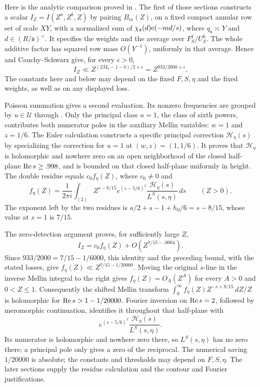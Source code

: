 Here is the analytic comparison proved in .
The first of those sections constructs a scalar
\(I_Z=I(Z^a,Z^b,Z)\) by pairing \(B_m(Z)\), on a fixed compact annular
row set of scale \(XY\), with a normalized sum of
\(\chi_{\mathfrak s}(d)\mathrm{e}(-md/s)\), where
\(q_{\mathfrak s}\asymp Y\) and \(d\in(R/\mathfrak s)^\times\).
It specifies the weights and the average over \(F_S^1/U_S^6\).
The whole additive factor has squared row mass \(O(Y^{-1})\), uniformly in
that average.  Hence  and Cauchy--Schwarz give,
for every \(\epsilon>0\),
\[
 I_Z\ll Z^{(2M_0-1-b)/2+\epsilon}
       =Z^{933/2000+\epsilon}.
\]
The constants here and below may depend on the fixed \(F,S,\eta\) and the
fixed weights, as well as on any displayed loss.

Poisson summation gives a second evaluation.  Its nonzero frequencies are
grouped by \(u\in\mathcal U\) through .
Only the principal class \(u=1\), the class of sixth powers, contributes
both numerator poles in the auxiliary Mellin variables: \(w=1\) and
\(z=1/6\).  The Euler calculation constructs a specific principal correction
\(\mathcal H_\eta(s)\) by specializing the correction for \(u=1\) at
\((w,z)=(1,1/6)\).  It proves that \(\mathcal H_\eta\) is holomorphic and
nowhere zero on an open neighborhood of the closed half-plane
\(\operatorname{Re} s\ge .998\), and is bounded on that closed half-plane uniformly in
height.  The double residue equals \(c_0f_\eta(Z)\), where \(c_0\ne0\) and
\[
 f_\eta(Z)=\frac1{2\pi i}\int_{(2)}
       Z^{s-8/15}e^{(s-5/6)^2}
       \frac{\mathcal H_\eta(s)}{L^S(s,\eta)}\,ds
       \qquad(Z>0).
\]
The exponent left by the two residues is
\(a/2+s-1+h_0/6=s-8/15\), whose value at \(s=1\) is \(7/15\).

The zero-detection argument proves, for sufficiently large \(Z\),
\[
 I_Z=c_0f_\eta(Z)+O(Z^{7/15-.0004}).
\]
Since \(933/2000=7/15-1/6000\), this identity and the preceding bound,
with the stated losses, give \(f_\eta(Z)\ll Z^{7/15-1/20000}\).
Moving the original \(s\)-line in the inverse Mellin integral to the right
gives \(f_\eta(Z)=O_A(Z^A)\) for every \(A>0\) and \(0<Z\le1\).
Consequently the shifted Mellin transform
\(\int_0^\infty f_\eta(Z)Z^{-s+8/15}\,dZ/Z\) is holomorphic for
\(\operatorname{Re} s>1-1/20000\).  Fourier inversion on \(\operatorname{Re} s=2\), followed by
meromorphic continuation, identifies it throughout that half-plane with
\[
 e^{(s-5/6)^2}\frac{\mathcal H_\eta(s)}{L^S(s,\eta)}.
\]
Its numerator is holomorphic and nowhere zero there, so \(L^S(s,\eta)\)
has no zero there; a principal pole only gives a zero of the reciprocal.
The numerical saving \(1/20000\) is absolute; the constants and thresholds
may depend on \(F,S,\eta\).  The later
sections supply the residue calculation and the contour and Fourier
justifications.
